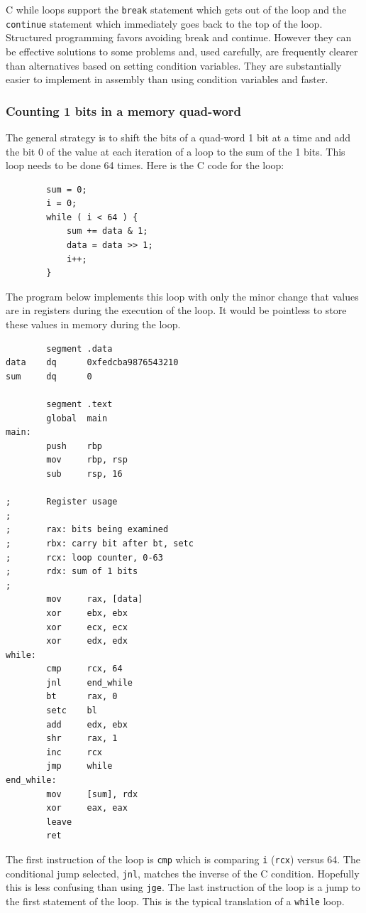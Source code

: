\documentclass[11pt,b5paper]{book}
\begin{document}
C while loops support the {\tt break} statement which gets out of the loop and the
{\tt continue} statement which immediately goes back to the top of the loop.
Structured programming favors avoiding break and continue.
However they can be effective solutions to some problems and, used carefully,
are frequently clearer than alternatives based on setting condition variables.
They are substantially easier to implement in assembly than using condition
variables and faster.


\subsubsection{Counting 1 bits in a memory quad-word}

The general strategy is to shift the bits of a quad-word 1 bit at a time and add the
bit 0 of the value at each iteration of a loop to the sum of the 1 bits.
This loop needs to be done 64 times.
Here is the C code for the loop:
\begin{verbatim}
        sum = 0;
        i = 0;
        while ( i < 64 ) {
            sum += data & 1;
            data = data >> 1;
            i++;
        }
\end{verbatim}

The program below implements this loop with only the minor change that values are in registers
during the execution of the loop.
It would be pointless to store these values in memory during the loop.

\begin{verbatim}
        segment .data
data    dq      0xfedcba9876543210
sum     dq      0

        segment .text
        global  main
main:
        push    rbp
        mov     rbp, rsp
        sub     rsp, 16

;       Register usage
;
;       rax: bits being examined
;       rbx: carry bit after bt, setc
;       rcx: loop counter, 0-63
;       rdx: sum of 1 bits
;
        mov     rax, [data]
        xor     ebx, ebx
        xor     ecx, ecx
        xor     edx, edx
while:
        cmp     rcx, 64
        jnl     end_while
        bt      rax, 0
        setc    bl
        add     edx, ebx
        shr     rax, 1
        inc     rcx
        jmp     while
end_while:
        mov     [sum], rdx
        xor     eax, eax
        leave
        ret
\end{verbatim}

The first instruction of the loop is {\tt cmp} which is comparing {\tt i} ({\tt rcx}) versus 64.
The conditional jump selected, {\tt jnl}, matches the inverse of the C condition.
Hopefully this is less confusing than using {\tt jge}.
The last instruction of the loop is a jump to the first statement of the loop.
This is the typical translation of a {\tt while} loop.
\end{document}
